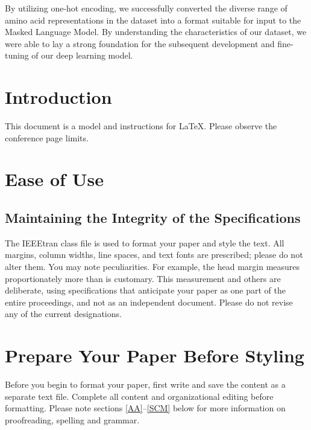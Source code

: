 \documentclass[conference]{IEEEtran}
\begin{document}
By utilizing one-hot encoding, we successfully converted the diverse range of amino acid representations in the dataset into a format suitable for input to the Masked Language Model. By understanding the characteristics of our dataset,  we were able to lay a strong foundation for the subsequent development and fine-tuning of our deep learning model. 
































\section{Introduction}
This document is a model and instructions for \LaTeX.
Please observe the conference page limits. 

\section{Ease of Use}

\subsection{Maintaining the Integrity of the Specifications}

The IEEEtran class file is used to format your paper and style the text. All margins, 
column widths, line spaces, and text fonts are prescribed; please do not 
alter them. You may note peculiarities. For example, the head margin
measures proportionately more than is customary. This measurement 
and others are deliberate, using specifications that anticipate your paper 
as one part of the entire proceedings, and not as an independent document. 
Please do not revise any of the current designations.

\section{Prepare Your Paper Before Styling}
Before you begin to format your paper, first write and save the content as a 
separate text file. Complete all content and organizational editing before 
formatting. Please note sections \ref{AA}--\ref{SCM} below for more information on 
proofreading, spelling and grammar.
\end{document}
